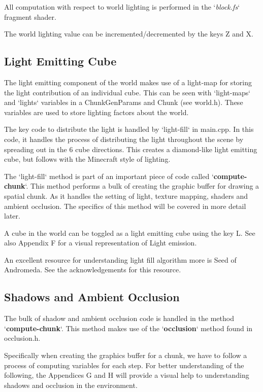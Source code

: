 \documentclass{book}
\begin{document}
All computation with respect to world lighting is performed in the `\textit{block.fs}` fragment shader.  
    
The world lighting value can be incremented/decremented by the keys Z and X.
    
\subsection{Light Emitting Cube}
The light emitting component of the world makes use of a light-map for storing the light contribution of an individual cube.  This can be seen with `light-maps` and `lights` variables in a ChunkGenParams and Chunk (see world.h).  These variables are used to store lighting factors about the world.
    
The key code to distribute the light is handled by `light-fill` in main.cpp.  In this code, it handles the process of distributing the light throughout the scene by spreading out in the 6 cube directions.  This creates a diamond-like light emitting cube, but follows with the Minecraft style of lighting.
    
The `light-fill` method is part of an important piece of code called `\textbf{compute-chunk}`.  This method performs a bulk of creating the graphic buffer for drawing a spatial chunk.  As it handles the setting of light, texture mapping, shaders and ambient occlusion.  The specifics of this method will be covered in more detail later.
    
A cube in the world can be toggled as a light emitting cube using the key L. See also Appendix F for a visual representation of Light emission.
    
An excellent resource for understanding light fill algorithm more is Seed of Andromeda.  See the acknowledgements for this resource. 
    
\subsection{Shadows and Ambient Occlusion}
    
The bulk of shadow and ambient occlusion code is handled in the method `\textbf{compute-chunk}`. This method makes use of the `\textbf{occlusion}` method found in occlusion.h.  
    
Specifically when creating the graphics buffer for a chunk, we have to follow a process of computing variables for each step.  For better understanding of the following, the Appendices G and H will provide a visual help to understanding shadows and occlusion in the environment.
    
\end{document}
